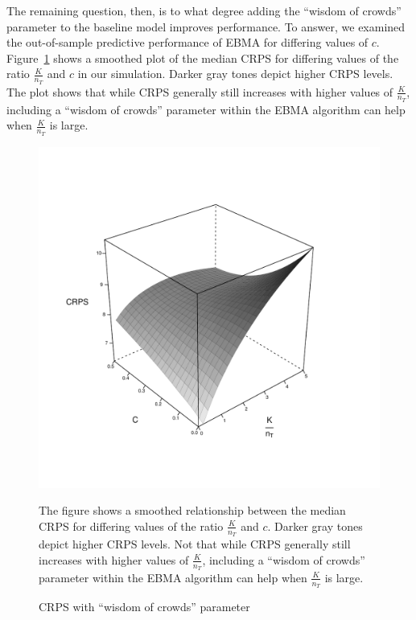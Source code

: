 \documentclass[12pt,fullpage,endnotes]{article}
\begin{document}


The remaining question, then, is to what degree adding the ``wisdom of
crowds'' parameter to the baseline model improves performance.  To
answer, we examined the out-of-sample predictive performance of EBMA
for differing values of $c$.  Figure~\ref{3d} shows a smoothed plot of
the median CRPS for differing values of the ratio $\frac{K}{n_T}$ and
$c$ in our simulation. Darker gray tones depict higher CRPS
levels. The plot shows that while CRPS generally still increases with
higher values of $\frac{K}{n_T}$, including a ``wisdom of crowds''
parameter within the EBMA algorithm can help when $\frac{K}{n_T}$ is
large.


\begin{figure}[ht]
\caption{CRPS with ``wisdom of crowds'' parameter}
\label{3d}
\begin{center}
\includegraphics[scale=.6]{3D}
\end{center}

The figure shows a smoothed relationship between the median CRPS for
differing values of the ratio $\frac{K}{n_T}$ and $c$. Darker gray
tones depict higher CRPS levels. Not that while CRPS generally still
increases with higher values of $\frac{K}{n_T}$, including a ``wisdom
of crowds'' parameter within the EBMA algorithm can help when
$\frac{K}{n_T}$ is large.

\end{figure}
\end{document}
